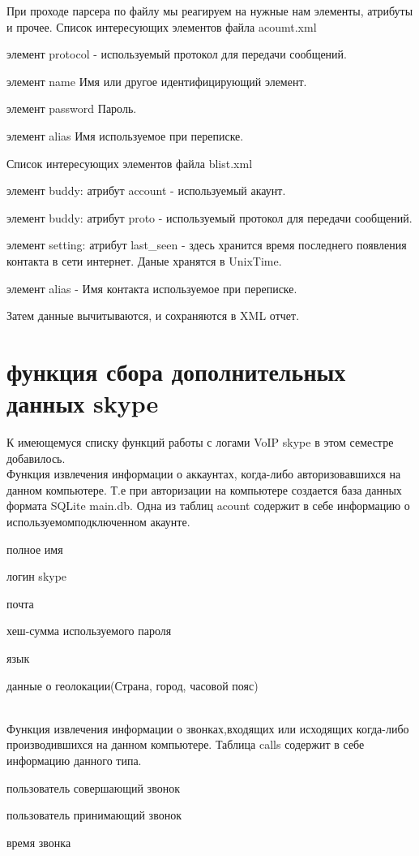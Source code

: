 При проходе парсера по файлу мы реагируем на нужные нам элементы, атрибуты и прочее.
Список интересующих элементов файла acoumt.xml

\item	элемент protocol - используемый протокол для передачи сообщений.
\item	элемент name 		Имя или другое идентифицирующий элемент.
\item	элемент password	Пароль.
\item	элемент alias		Имя используемое при переписке.

Список интересующих элементов файла blist.xml
\item	элемент buddy: атрибут account - используемый акаунт.
\item	элемент buddy: атрибут proto - используемый протокол для передачи сообщений.
\item	элемент setting: атрибут last_seen - здесь хранится время последнего появления контакта в сети интернет. Даные хранятся в UnixTime.
\item	элемент alias - Имя контакта используемое при переписке.

Затем данные вычитываются, и сохраняются в XML отчет.
\chapter*{функция сбора дополнительных данных skype}
К имеющемуся списку функций работы с логами VoIP skype в этом семестре добавилось. 
\\Функция извлечения информации о аккаунтах, когда-либо авторизовавшихся на данном компьютере. Т.е при авторизации на компьютере создается база данных формата SQLite main.db. Одна из таблиц acount содержит в себе информацию о используемом\/подключенном акаунте. 
\item полное имя
\item логин skype
\item почта
\item хеш-сумма используемого пароля
\item язык
\item данные о геолокации(Страна, город, часовой пояс)

\\Функция извлечения информации о звонках,входящих или исходящих когда-либо производившихся на данном компьютере. Таблица calls содержит в себе информацию данного типа.
\item пользователь совершающий звонок
\item пользователь принимающий звонок
\item время звонка

